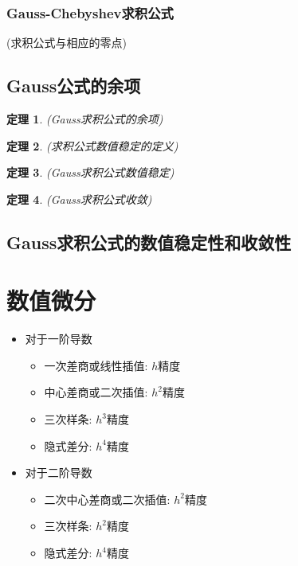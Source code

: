 \documentclass[twoside]{article}
\newtheorem{theorem}{定理}[section]
\begin{document}
\subsubsection{Gauss-Chebyshev求积公式}
(求积公式与相应的零点)
\subsection{Gauss公式的余项}
\begin{theorem}
  (Gauss求积公式的余项)
\end{theorem}
\begin{theorem}
  (求积公式数值稳定的定义)
\end{theorem}
\begin{theorem}
  (Gauss求积公式数值稳定)
\end{theorem}
\begin{theorem}
  (Gauss求积公式收敛)
\end{theorem}
\subsection{Gauss求积公式的数值稳定性和收敛性}

\section{数值微分}
\begin{itemize}
  \item 对于一阶导数
    \begin{itemize}
      \item 一次差商或线性插值: $h$精度
      \item 中心差商或二次插值: $h^2$精度
      \item 三次样条: $h^3$精度
      \item 隐式差分: $h^4$精度
    \end{itemize}
  \item 对于二阶导数
    \begin{itemize}
      \item 二次中心差商或二次插值: $h^2$精度
      \item 三次样条: $h^2$精度
      \item 隐式差分: $h^4$精度
    \end{itemize}
\end{itemize}
\end{document}
